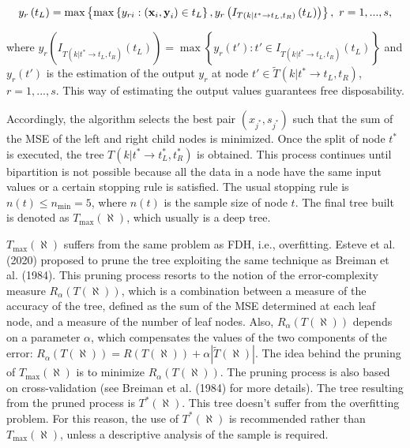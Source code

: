 \begin{equation} \label{(3)} 
y_{r} \left(t_{L} \right)=\max \left\{\max \left\{y_{ri} :\left({\it \textbf{x}}_{i} ,{\it \textbf{y}}_{i} \right)\in t_{L} \right\},y_{r} \left(I_{T\left(k|t^{*} \to t_{L} ,t_{R} \right)} \left(t_{L} \right)\right)\right\},\, \, r=1,...,s, 
\end{equation}

where \(y_{r} \left(I_{T\left(k|t^{*} \to t_{L} ,t_{R} \right)} \left(t_{L} \right)\right)= \max \left\{y_{r} \left(t'\right):t'\in I_{T\left(k|t^{*} \to t_{L} ,t_{R} \right)} \left(t_{L} \right)\right\}\) and \(y_{r} \left(t'\right)\) is the estimation of the output \(y_{r}\) at node \(t'\in \tilde{T}\left(k|t^{*} \to t_{L} ,t_{R} \right)\), \(r=1,...,s\). This way of estimating the output values guarantees free disposability.

Accordingly, the algorithm selects the best pair \(\left(x_{j^{*} } ,s_{j^{*} } \right)\) such that the sum of the MSE of the left and right child nodes is minimized. Once the split of node \(t^{*}\) is executed, the tree \(T\left(k|t^{*} \to t_{L}^{*} ,t_{R}^{*} \right)\) is obtained. This process continues until bipartition is not possible because all the data in a node have the same input values or a certain stopping rule is satisfied. The usual stopping rule is \(n\left(t\right)\le n_{\min } = 5\), where \(n(t)\) is the sample size of node \(t\). The final tree built is denoted as \(T_{\max } \left(\aleph \right)\), which usually is a deep tree.

\(T_{\max} \left(\aleph \right)\) suffers from the same problem as FDH, i.e., overfitting. Esteve et al. (2020) proposed to prune the tree exploiting the same technique as Breiman et al. (1984). This pruning process resorts to the notion of the error-complexity measure \(R_{\alpha} \left(T\left(\aleph \right)\right)\), which is a combination between a measure of the accuracy of the tree, defined as the sum of the MSE determined at each leaf node, and a measure of the number of leaf nodes. Also, \(R_{\alpha } \left(T\left(\aleph \right)\right)\) depends on a parameter \(\alpha\), which compensates the values of the two components of the error: \(R_{\alpha } \left(T\left(\aleph \right)\right)=R\left(T\left(\aleph \right)\right)+\alpha \left|\tilde{T}\left(\aleph \right)\right|\). The idea behind the pruning of \(T_{\max } \left(\aleph \right)\) is to minimize \(R_{\alpha } \left(T\left(\aleph \right)\right)\). The pruning process is also based on cross-validation (see Breiman et al. (1984) for more details). The tree resulting from the pruned process is \(T^{*} \left(\aleph \right)\). This tree doesn't suffer from the overfitting problem. For this reason, the use of \(T^{*} \left(\aleph \right)\) is recommended rather than \(T_{\max } \left(\aleph \right)\), unless a descriptive analysis of the sample is required.

